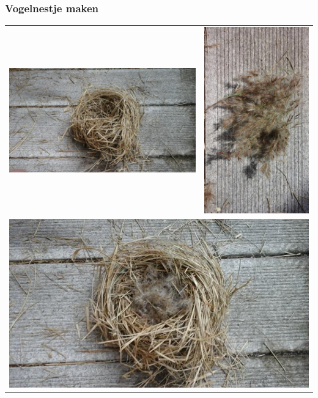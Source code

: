 \documentclass[a4paper, handout]{beamer}
\begin{document}
\begin{frame}
	\frametitle{Vogelnestje maken}
	\begin{tabular}{ c c }
		\includegraphics[scale=0.2]{nestje-1}
		&
		\includegraphics[scale=0.2]{nestje-2}
		\\
		\multicolumn{2}{c}{ \includegraphics[scale=0.2]{nestje-3}}

\end{tabular}
\end{frame}
\end{document}
